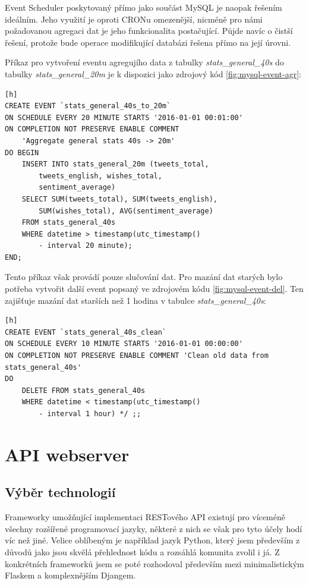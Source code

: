 \documentclass[thesis=B,czech]{FITthesis}[2012/06/26]
\begin{document}
	Event Scheduler poskytovaný přímo jako součást MySQL je naopak řešením ideálním. Jeho využití je oproti CRONu omezenější, nicméně pro námi požadovanou agregaci dat je jeho funkcionalita postačující. Půjde navíc o čistší řešení, protože bude operace modifikující databázi řešena přímo na její úrovni. 
	
	Příkaz pro vytvoření eventu agregujího data z tabulky \textit{stats\_general\_40s} do tabulky \textit{stats\_general\_20m} je k dispozici jako zdrojový kód \ref{fig:mysql-event-agr}:

\begin{lstlisting}[caption={MySQL Event provádějící agregaci dat},label=fig:mysql-event-agr][h]
CREATE EVENT `stats_general_40s_to_20m` 
ON SCHEDULE EVERY 20 MINUTE STARTS '2016-01-01 00:01:00' 
ON COMPLETION NOT PRESERVE ENABLE COMMENT 
	'Aggregate general stats 40s -> 20m' 
DO BEGIN 
	INSERT INTO stats_general_20m (tweets_total, 
		tweets_english, wishes_total, 
		sentiment_average) 
	SELECT SUM(tweets_total), SUM(tweets_english), 
		SUM(wishes_total), AVG(sentiment_average) 
	FROM stats_general_40s 
	WHERE datetime > timestamp(utc_timestamp() 
		- interval 20 minute); 
END;
\end{lstlisting}


Tento příkaz však provádí pouze slučování dat. Pro mazání dat starých bylo potřeba vytvořit další event popsaný ve zdrojovém kódu \ref{fig:mysql-event-del}. Ten zajišťuje mazání dat starších než 1 hodina v tabulce \textit{stats\_general\_40s}:

\begin{lstlisting}[caption={MySQL Event provádějící smazání starých dat},label=fig:mysql-event-del][h]
CREATE EVENT `stats_general_40s_clean` 
ON SCHEDULE EVERY 10 MINUTE STARTS '2016-01-01 00:00:00' 
ON COMPLETION NOT PRESERVE ENABLE COMMENT 'Clean old data from stats_general_40s' 
DO 
	DELETE FROM stats_general_40s
	WHERE datetime < timestamp(utc_timestamp() 
		- interval 1 hour) */ ;;
\end{lstlisting}

\section{API webserver}
\subsection{Výběr technologií}
	Frameworky umožňující implementaci RESTového API existují pro víceméně všechny rozšířené programovací jazyky, některé z nich se však pro tyto účely hodí víc než jiné. Velice oblíbeným je například jazyk Python, který jsem především z důvodů jako jsou skvělá přehlednost kódu a rozsáhlá komunita zvolil i já. Z konkrétních frameworků jsem se poté rozhodoval především mezi minimalistickým Flaskem a komplexnějším Djangem. 
	
\end{document}

